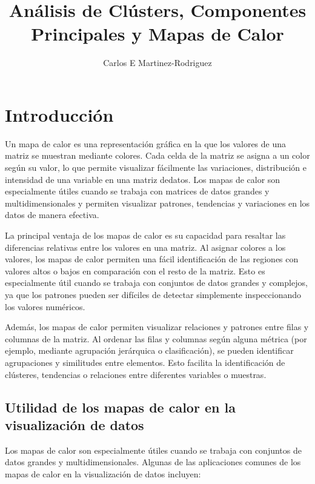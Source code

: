 \documentclass{article}
\title{An\'alisis de Cl\'usters, Componentes Principales y Mapas de Calor}
\author{Carlos E Martinez-Rodriguez}
\begin{document}
\maketitle
\tableofcontents
\medskip

\section{Introducción}

Un mapa de calor es una representación gráfica en la que los valores de una matriz se muestran mediante colores. Cada celda de la matriz se asigna a un color según su valor, lo que permite visualizar fácilmente las variaciones, distribuci\'on e intensidad de una variable en una matriz dedatos. Los mapas de calor son especialmente útiles cuando se trabaja con matrices de datos grandes y multidimensionales y permiten visualizar patrones, tendencias y variaciones en los datos de manera efectiva.

 La principal ventaja de los mapas de calor es su capacidad para resaltar las diferencias relativas entre los valores en una matriz. Al asignar colores a los valores, los mapas de calor permiten una fácil identificación de las regiones con valores altos o bajos en comparación con el resto de la matriz. Esto es especialmente útil cuando se trabaja con conjuntos de datos grandes y complejos, ya que los patrones pueden ser difíciles de detectar simplemente inspeccionando los valores numéricos.

Además, los mapas de calor permiten visualizar relaciones y patrones entre filas y columnas de la matriz. Al ordenar las filas y columnas según alguna métrica (por ejemplo, mediante agrupación jerárquica o clasificación), se pueden identificar agrupaciones y similitudes entre elementos. Esto facilita la identificación de clústeres, tendencias o relaciones entre diferentes variables o muestras.


\subsection{Utilidad de los mapas de calor en la visualización de datos}
Los mapas de calor son especialmente útiles cuando se trabaja con conjuntos de datos grandes y multidimensionales. Algunas de las aplicaciones comunes de los mapas de calor en la visualización de datos incluyen:
\end{document}

